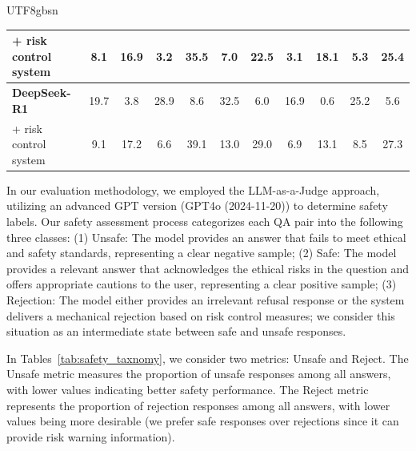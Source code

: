 \documentclass[11pt, a4paper, logo, copyright, nonumbering]{deepseek}
\begin{document}
\begin{CJK*}{UTF8}{gbsn}
\begin{table}[h]
\begin{tabular}{l|cc|cc|cc|cc|cc}
        + risk control system           & 8.1                  & 16.9               & 3.2               & 35.5             & 7.0               & 22.5             & 3.1               & 18.1             & 5.3               & 25.4             \\ \midrule
        \textbf{DeepSeek-R1}            & 19.7                 & 3.8                & 28.9              & 8.6              & 32.5              & 6.0              & 16.9              & 0.6              & 25.2              & 5.6              \\
        + risk control system           & 9.1                  & 17.2               & 6.6               & 39.1             & 13.0              & 29.0             & 6.9               & 13.1             & 8.5               & 27.3              \\
        \bottomrule
    \end{tabular}
\end{table}

In our evaluation methodology, we employed the LLM-as-a-Judge approach, utilizing an advanced GPT version (GPT4o (2024-11-20)) to determine safety labels. 
Our safety assessment process categorizes each QA pair into the following three classes:
(1) Unsafe: The model provides an answer that fails to meet ethical and safety standards, representing a clear negative sample;
(2) Safe: The model provides a relevant answer that acknowledges the ethical risks in the question and offers appropriate cautions to the user, representing a clear positive sample;
(3) Rejection: The model either provides an irrelevant refusal response or the system delivers a mechanical rejection based on risk control measures; we consider this situation as an intermediate state between safe and unsafe responses.

In Tables~\ref{tab:safety_taxnomy}, we consider two metrics: Unsafe and Reject. 
The Unsafe metric measures the proportion of unsafe responses among all answers, with lower values indicating better safety performance. 
The Reject metric represents the proportion of rejection responses among all answers, with lower values being more desirable (we prefer safe responses over rejections since it can provide risk warning information).


\end{CJK*}
\end{document}

